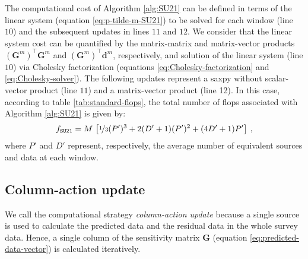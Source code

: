 The computational cost of Algorithm \ref{alg:SU21} can be defined in terms of the linear
system (equation \ref{eq:p-tilde-m-SU21}) to be solved for each window (line $10$) and the 
subsequent updates in lines $11$ and $12$.
We consider that the linear system cost can be quantified by the matrix-matrix and 
matrix-vector products $\left(\mathbf{G}^{m}\right)^{\top}\mathbf{G}^{m}$ and
$\left(\mathbf{G}^{m}\right)^{\top}\mathbf{d}^{m}$, respectively, 
and solution of the linear system (line $10$) via Cholesky factorization (equations 
\ref{eq:Cholesky-factorization} and \ref{eq:Cholesky-solver}).
The following updates represent a saxpy without scalar-vector product (line $11$) and a 
matrix-vector product (line 12). In this case, according to table \ref{tab:standard-flops},
the total number of flops associated with Algorithm \ref{alg:SU21} is given by:
\begin{equation}
	f_{\mathtt{SU21}} = M \, 
	\left[ \nicefrac{1}{3}(P')^3 + 2(D'+1)(P')^{2} + (4D'+1)P' \right] \: ,
	\label{flops:SU21}
\end{equation}
where $P'$ and $D'$ represent, respectively, the average number of equivalent sources and 
data at each window.

\subsection{Column-action update}

We call the computational strategy \textit{column-action update} because a single source is used to calculate the predicted data 
and the residual data in the whole survey data.
Hence, a single column of the sensitivity matrix $\mathbf{G}$ (equation \ref{eq:predicted-data-vector}) is
calculated iteratively.

